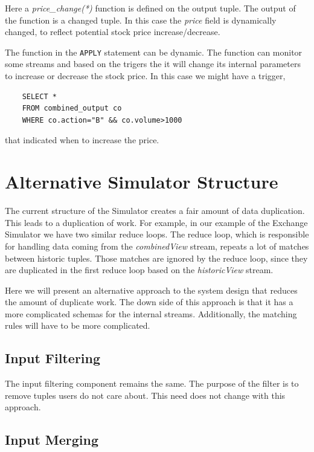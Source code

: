 \documentclass{article}
\begin{document}
Here a \emph{price\_change(*)} function is defined on the output tuple. The output of the function is a changed tuple. In this case the \emph{price} field is dynamically changed, to reflect potential stock price increase/decrease.

The function in the {\tt APPLY} statement can be dynamic. The function can monitor some streams and based on the trigers the it will change its internal parameters to increase or decrease the stock price. In this case we might have a trigger, 

\begin{verbatim}
    SELECT *
    FROM combined_output co
    WHERE co.action="B" && co.volume>1000
\end{verbatim}

that indicated when to increase the price. 

\section{Alternative Simulator Structure}

The current structure of the Simulator creates a fair amount of data duplication. This leads to a duplication of work. For example, in our example of the Exchange Simulator we have two similar reduce loops. The reduce loop, which is responsible for handling data coming from the \emph{combinedView} stream, repeats a lot of matches between historic tuples. Those matches are ignored by the reduce loop, since they are duplicated in the first reduce loop based on the \emph{historicView} stream. 

Here we will present an alternative approach to the system design that reduces the amount of duplicate work. The down side of this approach is that it has a more complicated schemas for the internal streams. Additionally, the matching rules will have to be more complicated.  

\subsection{Input Filtering}

The input filtering component remains the same. The purpose of the filter is to remove tuples users do not care about. This need does not change with this approach. 

\subsection{Input Merging}
\end{document}
